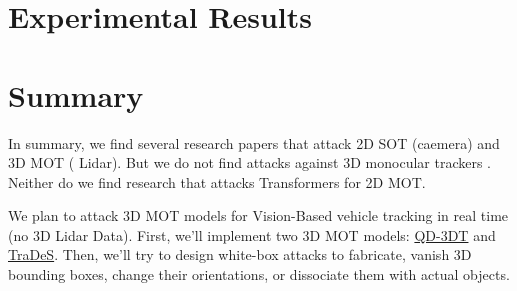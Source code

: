 \section{Experimental Results}



\section{Summary}

In summary, we find several research papers that attack 2D SOT (caemera) and 3D MOT ( Lidar). But we do not find attacks against 3D monocular trackers \citep{wu2021track} \citep{hu2022monocular}. Neither do we find research that attacks Transformers for 2D MOT.

We plan to attack 3D MOT models for Vision-Based vehicle tracking in real time (no 3D Lidar Data). First, we'll implement two 3D MOT models: \href{https://github.com/SysCV/qd-3dt}{QD-3DT} and \href{https://github.com/JialianW/TraDeS}{TraDeS}. Then, we'll try to design white-box attacks to fabricate, vanish 3D bounding boxes, change their orientations, or dissociate them with actual objects.





